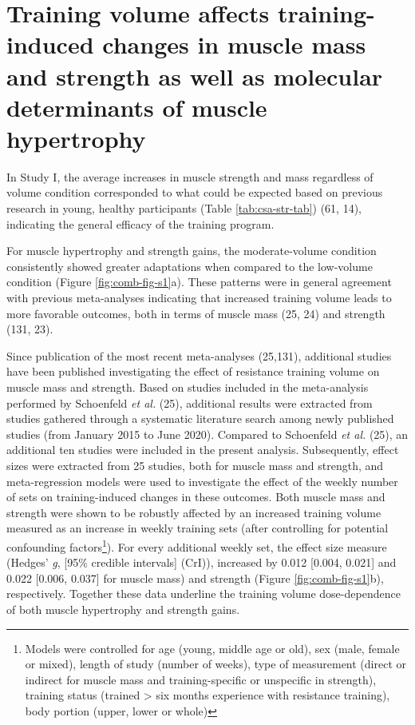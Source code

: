 \documentclass[twoside,10pt]{gihclass} %
\begin{document}
\hypertarget{muscle-mass-growth}{%
\section{Training volume affects training-induced changes in muscle mass and strength as well as molecular determinants of muscle hypertrophy}\label{muscle-mass-growth}}

In Study I, the average increases in muscle strength and mass regardless of volume condition corresponded to what could be expected based on previous research in young, healthy participants (Table \ref{tab:csa-str-tab})
(61, 14),
indicating the general efficacy of the training program.

For muscle hypertrophy and strength gains, the moderate-volume condition consistently showed greater adaptations when compared to the low-volume condition (Figure \ref{fig:comb-fig-s1}a).
These patterns were in general agreement with previous meta-analyses indicating that increased training volume leads to more favorable outcomes, both in terms of muscle mass
(25, 24)
and strength
(131, 23).

Since publication of the most recent meta-analyses (25,131),
additional studies have been published investigating the effect of resistance training volume on muscle mass and strength. Based on studies included in the meta-analysis performed by Schoenfeld \emph{et al.} (25), additional results were extracted from studies gathered through a systematic literature search among newly published studies (from January 2015 to June 2020). Compared to Schoenfeld \emph{et al.} (25), an additional ten studies were included in the present analysis.
Subsequently, effect sizes were extracted from 25 studies, both for muscle mass and strength, and meta-regression models were used to investigate the effect of the weekly number of sets on training-induced changes in these outcomes.
Both muscle mass and strength were shown to be robustly affected by an increased training volume measured as an increase in weekly training sets (after controlling for potential confounding factors\footnote{Models were controlled for age (young, middle age or old), sex (male, female or mixed), length of study (number of weeks), type of measurement (direct or indirect for muscle mass and training-specific or unspecific in strength), training status (trained \textgreater{} six months experience with resistance training), body portion (upper, lower or whole)}).
For every additional weekly set, the effect size measure (Hedges' \emph{g}, {[}95\% credible intervals{]} (CrI)), increased by
0.012 {[}0.004, 0.021{]} and 0.022 {[}0.006, 0.037{]}
for muscle mass)
and strength (Figure \ref{fig:comb-fig-s1}b),
respectively.
Together these data underline the training volume dose-dependence of both muscle hypertrophy and strength gains.
\end{document}
